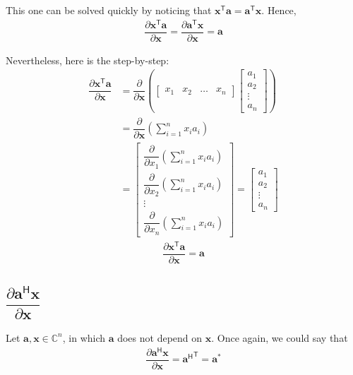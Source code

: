 \documentclass{article}
\newcommand{\trans}{\mathsf{T}}
\newcommand{\hermit}{\mathsf{H}}
\begin{document}
This one can be solved quickly by noticing that \(\mathbf{x}^\trans  \mathbf{a} = \mathbf{a}^\trans  \mathbf{x}\). Hence,
\begin{align}
    \dfrac{\partial \mathbf{x}^\trans  \mathbf{a}}{\partial \mathbf{x}} = \dfrac{\partial \mathbf{a}^\trans  \mathbf{x}}{\partial \mathbf{x}} = \mathbf{a}
\end{align}

Nevertheless, here is the step-by-step:
\begin{align}
    \dfrac{\partial \mathbf{x}^\trans \mathbf{a}}{\partial \mathbf{x}} &= \dfrac{\partial}{\partial \mathbf{x}} \left(
    \begin{bmatrix}
        x_1 & x_2 & \dots & x_n
    \end{bmatrix} \begin{bmatrix}
        a_{1} \\ a_{2} \\ \vdots \\ a_{n}
    \end{bmatrix} \right) \\
    & = \dfrac{\partial}{\partial \mathbf{x}} \left( \sum_{i = 1}^n x_ia_i \right) \\
    & = \begin{bmatrix}
        \dfrac{\partial}{\partial x_1} \left( \sum_{i = 1}^n x_ia_i \right) \\ \dfrac{\partial}{\partial x_2} \left( \sum_{i = 1}^n x_ia_i \right) \\ \vdots \\ \dfrac{\partial}{\partial x_n} \left( \sum_{i = 1}^n x_ia_i \right) 
    \end{bmatrix} 
    = \begin{bmatrix}
        a_1 \\ a_2 \\ \vdots \\ a_n
    \end{bmatrix}
\end{align}
\begin{align}
    \boxed{\dfrac{\partial \mathbf{x}^\trans \mathbf{a}}{\partial \mathbf{x}} = \mathbf{a}}
\end{align}

\subsection{\(\dfrac{\partial \mathbf{a}^\hermit  \mathbf{x}}{\partial \mathbf{x}}\)}

Let \(\mathbf{a, x} \in \mathbb{C}^{n}\), in which \(\mathbf{a}\) does not depend on \(\mathbf{x}\). Once again, we could say that
\begin{align}
    \dfrac{\partial \mathbf{a}^\hermit \mathbf{x}}{\partial \mathbf{x}} = {\mathbf{a}^\hermit}^\trans = \mathbf{a}^*
\end{align}
\end{document}
